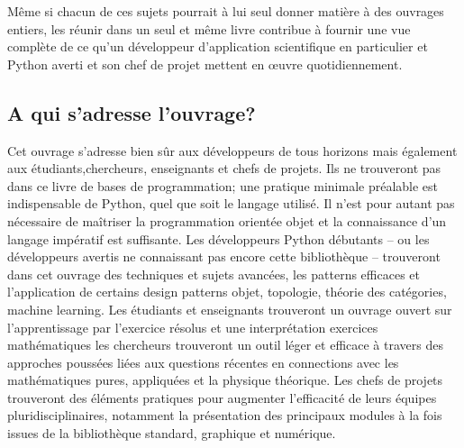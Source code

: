 Même si chacun de ces sujets pourrait à lui seul donner matière à des ouvrages entiers, les réunir dans 
un seul et même livre contribue à fournir une vue complète de ce qu’un développeur d'application 
scientifique en particulier et Python averti et son chef de projet mettent en œuvre quotidiennement.

\subsection*{A qui s'adresse l'ouvrage?}
Cet ouvrage s’adresse bien sûr aux développeurs de tous horizons mais également aux
étudiants,chercheurs, enseignants et chefs de projets. Ils ne trouveront pas dans ce livre de bases de 
programmation; une pratique minimale préalable est indispensable de Python, quel que soit le langage 
utilisé. Il n'est pour autant pas nécessaire de maîtriser la programmation orientée objet et 
la connaissance d'un langage impératif est suffisante.
Les développeurs Python débutants – ou les développeurs avertis ne connaissant pas
encore cette bibliothèque – trouveront dans cet ouvrage des techniques et sujets avancées, les patterns 
efficaces et l'application de certains design patterns objet, topologie, théorie des catégories, machine
learning.
Les étudiants et enseignants trouveront un ouvrage ouvert sur l'apprentissage par l'exercice résolus et 
une interprétation exercices mathématiques  
les chercheurs trouveront un outil léger et efficace à travers des approches poussées liées aux 
questions récentes en connections avec les mathématiques pures, appliquées et la physique théorique.
Les chefs de projets trouveront des éléments pratiques pour augmenter l’efficacité de
leurs équipes pluridisciplinaires, notamment la présentation des principaux modules à la fois issues de la bibliothèque standard, graphique et numérique.
